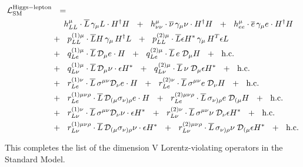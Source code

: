 \documentclass[12pt]{revtex4}
\newcommand{\ov}{\overline}
\newcommand{\md}{\mathcal{D}}
\begin{document}
\begin{align}
\notag
	\mathcal{L}_{\rm SM}^{\rm Higgs-lepton} & ~~=~~
	\\
\notag
	&
	\phantom{+~~}
	h_{LL}^\mu \cdot
	\ov{L}\, \gamma_\mu L \cdot H^\dag H ~~+~~
	h_{\nu\nu}^\mu \cdot
	\ov{\nu}\, \gamma_\mu \nu \cdot H^\dag H ~~+~~
	h_{ee}^\mu \cdot
	\ov{e}\, \gamma_\mu e \cdot H^\dag H 
	\\
\notag
	&
	+~~
	p^{(1)\mu}_{LL} \cdot
	\ov{L}H \, \gamma_\mu\, H^\dag L ~~+~~
	p^{(2)\mu}_{LL} \cdot
	\ov{L}\epsilon H^* \, \gamma_\mu \, H^T \epsilon L 
	\\
\notag
	&
	+~~
	q^{(1)\mu}_{Le} \cdot
	\ov{L}\, \md_\mu e\cdot H ~~+~~
	q^{(2)\mu}_{Le} \cdot
	\ov{L}\, e \; \md_\mu H ~~+~~
	\text{h.c.}
	\\
\notag
	&
	+~~
	q^{(1)\mu}_{L\nu} \cdot
	\ov{L}\, \md_\mu \nu \cdot \epsilon H^* ~~+~~
	q^{(2)\mu}_{L\nu} \cdot
	\ov{L}\, \nu \; \md_\mu \epsilon H^* ~~+~~
	\text{h.c.}
	\\
\notag
	&
	+~~
	r^{(1)\nu}_{Le} \cdot
	\ov{L}\, \sigma^{\mu\nu} \md_\nu e \cdot H ~~+~~
	r^{(2)\nu}_{Le} \cdot
	\ov{L}\, \sigma^{\mu\nu} e\; \md_\nu H ~~+~~
	\text{h.c.}
	\\
\notag
	&
	+~~
	r^{(1)\mu\nu\rho}_{Le} \cdot
	\ov{L}\, \md_{(\mu} \sigma_{\nu)\rho} e \cdot H ~~+~~
	r^{(2)\mu\nu\rho}_{Le} \cdot
	\ov{L}\, \sigma_{\nu)\rho} e \; \md_{(\mu} H ~~+~~
	\text{h.c.}
	\\
\notag
	&
	+~~
	r^{(1)\nu}_{L\nu} \cdot
	\ov{L}\, \sigma^{\mu\nu} \md_\nu \nu \cdot \epsilon H^* ~~+~~
	r^{(2)\nu}_{L\nu} \cdot
	\ov{L}\, \sigma^{\mu\nu} \nu\; \md_\nu \epsilon H^* ~~+~~
	\text{h.c.}
	\\
\notag
	&
	+~~
	r^{(1)\mu\nu\rho}_{L\nu} \cdot
	\ov{L}\, \md_{(\mu} \sigma_{\nu)\rho} \nu \cdot \epsilon H^* ~~+~~
	r^{(2)\mu\nu\rho}_{L\nu} \cdot
	\ov{L}\, \sigma_{\nu)\rho} \nu \; \md_{(\mu} \epsilon H^* ~~+~~
	\text{h.c.}
\end{align}

	This completes the list of the dimension V Lorentz-violating
	operators in the Standard Model.
\end{document}
